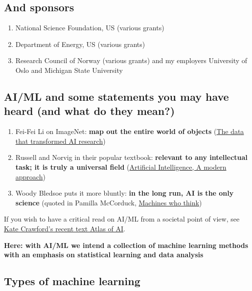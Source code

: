 \documentclass[%
oneside,                 %
final,                   %
10pt]{article}
\begin{document}
\subsection{And sponsors}

\begin{enumerate}
\item National Science Foundation, US (various grants)

\item Department of Energy, US (various grants)

\item Research Council of Norway (various grants) and my employers University of Oslo and Michigan State University
\end{enumerate}

\noindent
\subsection{AI/ML and some statements you may have heard (and what do they mean?)}

\begin{enumerate}
\item Fei-Fei Li on ImageNet: \textbf{map out the entire world of objects} (\href{{https://cacm.acm.org/news/219702-the-data-that-transformed-ai-research-and-possibly-the-world/fulltext}}{The data that transformed AI research})

\item Russell and Norvig in their popular textbook: \textbf{relevant to any intellectual task; it is truly a universal field} (\href{{http://aima.cs.berkeley.edu/}}{Artificial Intelligence, A modern approach})

\item Woody Bledsoe puts it more bluntly: \textbf{in the long run, AI is the only science} (quoted in Pamilla McCorduck, \href{{https://www.pamelamccorduck.com/machines-who-think}}{Machines who think})
\end{enumerate}

\noindent
If you wish to have a critical read on AI/ML from a societal point of view, see \href{{https://www.katecrawford.net/}}{Kate Crawford's recent text Atlas of AI}. 

\textbf{Here: with AI/ML we intend a collection of machine learning methods with an emphasis on statistical learning and data analysis}

\subsection{Types of machine learning}
\end{document}
